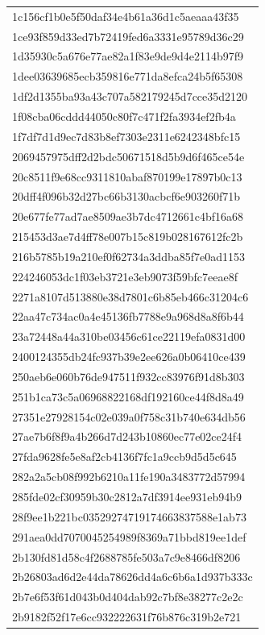 \begin{tabular}{l}
1c156cf1b0e5f50daf34e4b61a36d1c5aeaaa43f35 \\
1ce93f859d33ed7b72419fed6a3331e95789d36c29 \\
1d35930c5a676e77ae82a1f83e9de9d4e2114b97f9 \\
1dee03639685ecb359816e771da8efca24b5f65308 \\
1df2d1355ba93a43c707a582179245d7cce35d2120 \\
1f08cba06cddd44050c80f7c471f2fa3934ef2fb4a \\
1f7df7d1d9ec7d83b8ef7303e2311e6242348bfc15 \\
2069457975dff2d2bdc50671518d5b9d6f465ce54e \\
20c8511f9e68cc9311810abaf870199e17897b0c13 \\
20dff4f096b32d27bc66b3130acbcf6e903260f71b \\
20e677fe77ad7ae8509ae3b7dc4712661c4bf16a68 \\
215453d3ae7d4ff78e007b15c819b028167612fc2b \\
216b5785b19a210ef0f62734a3ddba85f7e0ad1153 \\
224246053dc1f03eb3721e3eb9073f59bfc7eeae8f \\
2271a8107d513880e38d7801c6b85eb466c31204c6 \\
22aa47c734ac0a4e45136fb7788e9a968d8a8f6b44 \\
23a72448a44a310be03456c61ce22119efa0831d00 \\
2400124355db24fc937b39e2ee626a0b06410ce439 \\
250aeb6e060b76de947511f932cc83976f91d8b303 \\
251b1ca73c5a06968822168df192160ce44f8d8a49 \\
27351e27928154c02e039a0f758c31b740e634db56 \\
27ae7b6f8f9a4b266d7d243b10860ec77e02ce24f4 \\
27fda9628fe5e8af2cb4136f7fc1a9ccb9d5d5c645 \\
282a2a5cb08f992b6210a11fe190a3483772d57994 \\
285fde02cf30959b30c2812a7df3914ee931eb94b9 \\
28f9ee1b221bc03529274719174663837588e1ab73 \\
291aea0dd7070045254989f8369a71bbd819ee1def \\
2b130fd81d58c4f2688785fe503a7c9e8466df8206 \\
2b26803ad6d2e44da78626dd4a6c6b6a1d937b333c \\
2b7e6f53f61d043b0d404dab92c7bf8e38277c2e2c \\
2b9182f52f17e6cc932222631f76b876c319b2e721 \\

\end{tabular}

